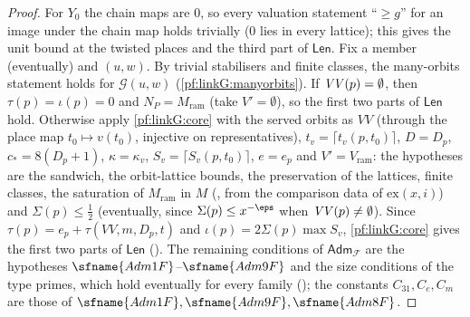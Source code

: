 \begin{proof}
For $Y_0$ the chain maps are $0$, so every valuation statement ``$\ge g$'' for an image under the chain map holds
trivially ($0$ lies in every lattice); this gives the unit bound at the twisted places and the third part of
$\mathsf{Len}$. Fix a member (eventually) and $(u,w)$. By trivial stabilisers and finite classes, the many-orbits
statement holds for $\mathcal G(u,w)$ (\cref{pf:linkG:manyorbits}). If
$\mathit{VV}(p)=\emptyset$, then $\tau(p)=\iota(p)=0$ and $N_P=M_{\mathrm{ram}}$ (take $V'=\emptyset$), so the first two parts
of $\mathsf{Len}$ hold. Otherwise apply \cref{pf:linkG:core} with the served orbits as $VV$ (through the place map
$t_0\mapsto v(t_0)$, injective on representatives), $t_v=\lceil t_v(p,t_0)\rceil$, $D=D_p$, $c_*=8(D_p+1)$, $\kappa=\kappa_v$,
$S_v=\lceil S_v(p,t_0)\rceil$, $e=e_p$ and $V'=V_{\mathrm{ram}}$: the hypotheses are the sandwich, the orbit-lattice
bounds, the preservation of the lattices, finite classes, the saturation of $M_{\mathrm{ram}}$ in $M$
(, from the comparison data of $\mathrm{ex}(x,i)$) and
$\Sigma(p)\le\frac12$
(eventually, since $\Sigma(p)\le x^{-\eps}$ when $\mathit{VV}(p)\ne\emptyset$).
Since $\tau(p)=e_p+\tau(VV,m,D_p,t)$ and $\iota(p)=2\Sigma(p)\max S_v$, \cref{pf:linkG:core} gives the first two parts of
$\mathsf{Len}$ (). The remaining conditions of
$\mathsf{Adm}_{\mathcal F}$ are the hypotheses $\sfname{Adm1F}$--$\sfname{Adm9F}$ and the size conditions of the type primes, which
hold eventually for every family (); the constants
$C_{31},C_e,C_m$ are those of $\sfname{Adm1F},\sfname{Adm9F},\sfname{Adm8F}$.
\end{proof}


